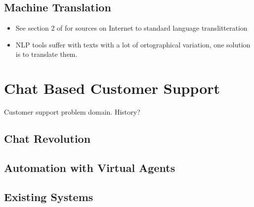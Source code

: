 \documentclass[12pt,a4paper,english
]{tutthesis}
\begin{document}
\section{Machine Translation}
\label{se:machine_translation}
\begin{itemize}
\item See section 2 of \cite{Kestemont2016} for sources on Internet to standard language translitteration
\item NLP tools suffer with texts with a lot of ortographical variation, one solution is to translate them. \cite{Kestemont2016}
\end{itemize}

\chapter{Chat Based Customer Support}
\label{ch:chat_based_customer_support}
Customer support problem domain. History?
\section{Chat Revolution}
\section{Automation with Virtual Agents}
\section{Existing Systems}
\end{document}

